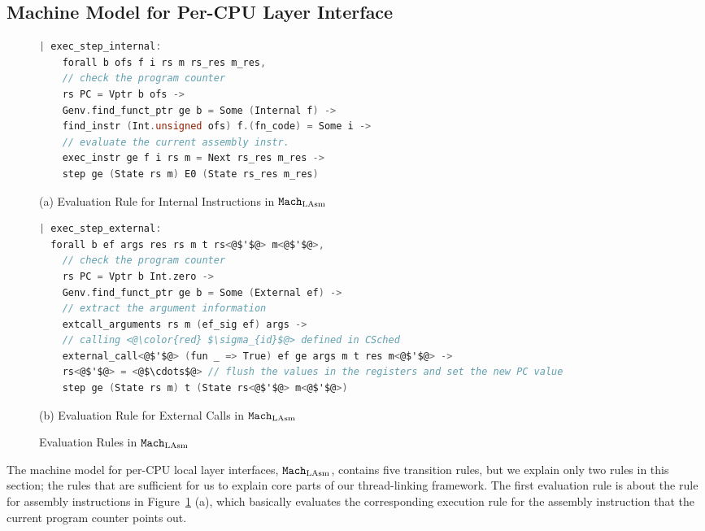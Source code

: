 \subsection{Machine Model for Per-CPU Layer Interface}
\label{chapter:linking:subsec:cpu-local-layer-interface}


\begin{figure}
\begin{lstlisting}[language=C, deletekeywords={unsigned, struct}]
| exec_step_internal:
    forall b ofs f i rs m rs_res m_res,
    // check the program counter
    rs PC = Vptr b ofs ->
    Genv.find_funct_ptr ge b = Some (Internal f) ->
    find_instr (Int.unsigned ofs) f.(fn_code) = Some i ->
    // evaluate the current assembly instr.         
    exec_instr ge f i rs m = Next rs_res m_res ->
    step ge (State rs m) E0 (State rs_res m_res)
\end{lstlisting}
\begin{center}
(a) Evaluation Rule for Internal Instructions in ${\mathrm{\texttt{Mach}}}_{\mathrm{LAsm}}$
\end{center}
\begin{lstlisting}[language=C]
| exec_step_external:
  forall b ef args res rs m t rs<@$'$@> m<@$'$@>,
    // check the program counter  
    rs PC = Vptr b Int.zero ->
    Genv.find_funct_ptr ge b = Some (External ef) ->
    // extract the argument information
    extcall_arguments rs m (ef_sig ef) args ->
    // calling <@\color{red} $\sigma_{id}$@> defined in CSched
    external_call<@$'$@> (fun _ => True) ef ge args m t res m<@$'$@> ->
    rs<@$'$@> = <@$\cdots$@> // flush the values in the registers and set the new PC value
    step ge (State rs m) t (State rs<@$'$@> m<@$'$@>)
\end{lstlisting}
\begin{center}
(b) Evaluation Rule for External Calls in ${\mathrm{\texttt{Mach}}}_{\mathrm{LAsm}}$
\end{center}
\caption{Evaluation Rules in ${\mathrm{\texttt{Mach}}}_{\mathrm{LAsm}}$}
\label{fig:chapter:linking:eval-rule-in-lasm}
\end{figure}

The machine model for per-CPU local layer interfaces,
${\mathrm{\texttt{Mach}}}_{\mathrm{LAsm}}$, contains five transition rules, 
but we explain only two rules in this section; the rules 
that are sufficient for us to explain core parts of our thread-linking framework.
The first evaluation rule is 
about the rule for assembly instructions in Figure~\ref{fig:chapter:linking:eval-rule-in-lasm} (a), 
which basically evaluates the corresponding execution 
rule for the assembly instruction that the current program counter points out. 

